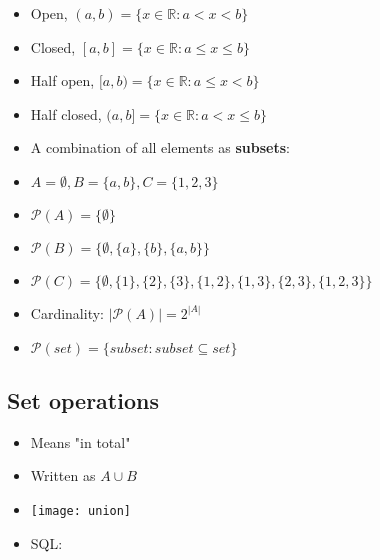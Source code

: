 \documentclass[english,10pt,a4paper]{article}
\begin{document}
\begin{theo}[Intervals] 
\begin{itemize}
\item Open, $(a,b) = \{ x \in \mathbb{R}: a < x < b \}$
\item Closed, $[a,b] = \{ x \in \mathbb{R}: a \leq x \leq b \}$
\item Half open, $[a,b) = \{ x \in \mathbb{R}: a \leq x < b \}$
\item Half closed, $(a,b] = \{ x \in \mathbb{R}: a < x \leq b \}$
\end{itemize}
\end{theo}


\begin{theo} 
\begin{itemize}
\item A combination of all elements as \textbf{subsets}:
\item[] $A=\emptyset, B= \{a,b\}, C=\{1,2,3\}$
\item $\mathcal{P}(A) = \{\emptyset\} $
\item $\mathcal{P}(B) = \{\emptyset, \{a\}, \{b\}, \{a,b\} \}$
\item $\mathcal{P}(C) = \{\emptyset, \{1\}, \{2\}, \{3\}, \{1,2\}, \{1,3\}, \{2, 3\}, \{1,2,3\} \}$
\item Cardinality: $|\mathcal{P}(A)| = 2^{|A|}$
\item $\mathcal{P}(set) = \{subset : subset \subseteq set\}$
\end{itemize}
\end{theo}



\subsection{Set operations}
\begin{theo}[Union] 
\begin{itemize}
\item Means "in total"
\item Written as $A \cup B$
\item[] \texttt{[image: union]} 
\item SQL: 
\end{itemize}

\end{theo}
\end{document}
